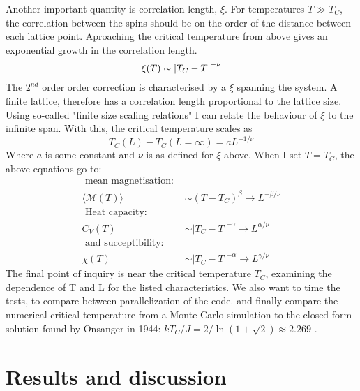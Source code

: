 \documentclass[10pt, twocolumn]{revtex4-1}
\begin{document}
Another important quantity is correlation length, $\xi$. For temperatures $T \gg T_C$, the correlation between the spins should be on the order of the
distance between each lattice point. Aproaching the critical temperature from above gives an exponential
growth in the correlation length.
\[ \xi(T) \sim \qty| T_C - T |^{-\nu} \]
The $2^{nd}$ order order correction is characterised by a $\xi$ spanning the system. A finite lattice, therefore has a correlation length proportional to
the lattice size. Using so-called "finite size scaling relations" I can relate the behaviour of $\xi$ to the infinite span. With this, the critical
temperature scales as
\[ T _ { C } ( L ) - T _ { C } ( L = \infty ) = a L ^ { - 1 / \nu } \]
Where $a$ is some constant and $\nu$ is as defined for $\xi$ above. When I set $T = T_C$, the above equations go to:
\begin{align*}
    \text{ mean magnetisation: } \\
    \langle \mathcal { M } ( T ) \rangle &\sim \left( T - T _ { C } \right) ^ { \beta } \rightarrow L ^ { - \beta / \nu }\\
    \text{ Heat capacity: } \\
    C _ { V } ( T ) &\sim \left| T _ { C } - T \right| ^ { - \gamma } \rightarrow L ^ { \alpha / \nu }\\
    \text{ and succeptibility: } \\
    \chi ( T ) &\sim \left| T _ { C } - T \right| ^ { - \alpha } \rightarrow L ^ { \gamma / \nu }
\end{align*}
The final point of inquiry is near the critical temperature $T_C$, examining the dependence of T and L for the listed characteristics.
We also want to time the tests, to compare between parallelization of the code. and finally compare the numerical critical temperature from a Monte Carlo
simulation to the closed-form solution found by Onsanger in 1944: $k T _ { C } / J = 2 / \ln ( 1 + \sqrt { 2 } ) \approx 2.269$ \cite{PhysRev.65.117}.



\section{Results and discussion}
\end{document}
